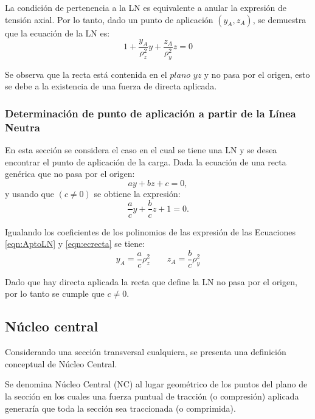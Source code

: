 La condición de pertenencia a la LN es equivalente a anular la expresión de tensión axial. %
%
Por lo tanto, dado un punto de aplicación $(y_A,z_A)$, se demuestra que la ecuación de la LN es:
%
\begin{equation}\label{eqn:AptoLN}
\boxed{1 +  \frac{ y_A}{\rho_z^2} y +  \frac{ z_A}{\rho_y^2} z = 0}
\end{equation}

Se observa que la recta está contenida en el $plano$ $yz$ y no pasa por el origen, esto se debe a la existencia de una fuerza de directa aplicada.
%


\subsubsection{Determinación de punto de aplicación a partir de la Línea Neutra}

En esta sección se considera el caso en el cual se tiene una LN y se desea encontrar el punto de aplicación de la carga. %
%
Dada la ecuación de una recta genérica que no pasa por el origen:
$$
a y + b z +  c = 0,
$$
%
y usando que $(c\neq0)$ se obtiene la expresión:
%
\begin{equation}\label{eqn:ecrecta}
\frac{a}{c} y + \frac{b}{c} z +  1 = 0.
\end{equation}

Igualando los coeficientes de los polinomios de las expresión de las Ecuaciones \eqref{eqn:AptoLN} y \eqref{eqn:ecrecta} se tiene:
%
\begin{equation}
\boxed{y_A = \frac{a}{c} \rho_z^2
\qquad
z_A = \frac{b}{c} \rho_y^2}
\end{equation}

Dado que hay directa aplicada la recta que define la LN no pasa por el origen, por lo tanto se cumple que $c\neq0$.




\subsection{Núcleo central} \label{sec:nucleocentral}

Considerando una sección transversal cualquiera, se presenta una definición conceptual de Núcleo Central.

{Se denomina Núcleo Central (NC) al lugar geométrico de los puntos del plano de la sección en los cuales una fuerza puntual de tracción (o compresión) aplicada generaría que toda la sección sea traccionada (o comprimida).}

